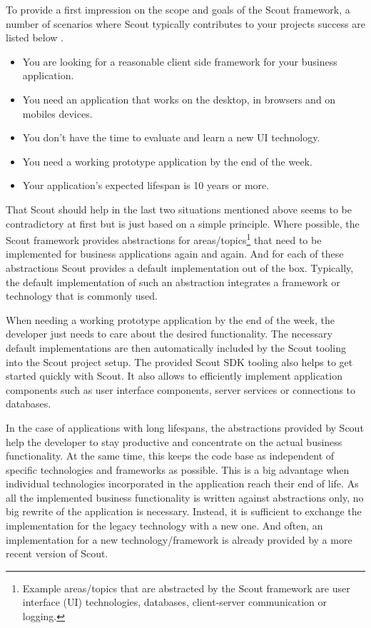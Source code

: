 \documentclass[a4paper,10pt,twoside]{book}
\begin{document}



To provide a first impression on the scope and goals of the Scout framework, a number of scenarios where Scout typically contributes to your projects success are listed below . 

\begin{itemize}
\item You are looking for a reasonable client side framework for your business application.  
\item You need an application that works on the desktop, in browsers and on mobiles devices. 
\item You don't have the time to evaluate and learn a new UI technology. 
\item You need a working prototype application by the end of the week. 
\item Your application's expected lifespan is 10 years or more. 
\end{itemize}

\noindent That Scout should help in the last two situations mentioned above seems to be contradictory at first but is just based on a simple principle.  
Where possible, the Scout framework provides abstractions for areas/topics\footnote{
Example areas/topics that are abstracted by the Scout framework are user interface (UI) technologies, databases, client-server communication or logging. 
} 
that need to be implemented for business applications again and again. 
And for each of these abstractions Scout provides a default implementation out of the box.
Typically, the default implementation of such an abstraction integrates a framework or technology that is commonly used. 

When needing a working prototype application by the end of the week, the developer just needs to care about the desired functionality. 
The necessary default implementations are then automatically included by the Scout tooling into the Scout project setup.
The provided Scout SDK tooling also helps to get started quickly with Scout. 
It also allows to efficiently implement application components such as user interface components, server services or connections to databases.

In the case of applications with long lifespans, the abstractions provided by Scout help the developer to stay productive and concentrate on the actual business functionality. 
At the same time, this keeps the code base as independent of specific technologies and frameworks as possible. 
This is a big advantage when individual technologies incorporated in the application reach their end of life. 
As all the implemented business functionality is written against abstractions only, no big rewrite of the application is necessary. 
Instead, it is sufficient to exchange the implementation for the legacy technology with a new one. 
And often, an implementation for a new technology/framework is already provided by a more recent version of Scout. 
\end{document}
